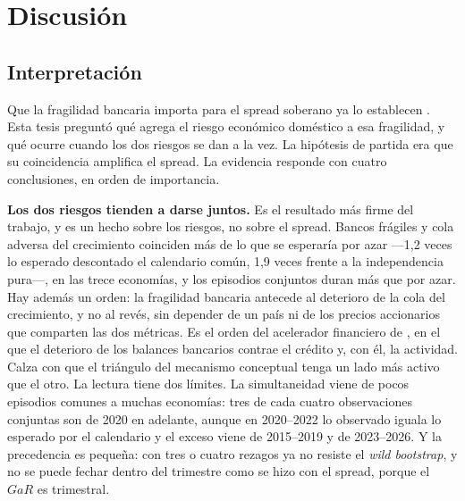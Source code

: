 \chapter{Discusión}
\label{sec:discusion}

\section{Interpretación}

Que la fragilidad bancaria importa para el spread soberano ya lo establecen \citet{Chari2024b}. Esta tesis preguntó qué agrega el riesgo económico doméstico a esa fragilidad, y qué ocurre cuando los dos riesgos se dan a la vez. La hipótesis de partida era que su coincidencia amplifica el spread. La evidencia responde con cuatro conclusiones, en orden de importancia.

\textbf{Los dos riesgos tienden a darse juntos.} Es el resultado más firme del trabajo, y es un hecho sobre los riesgos, no sobre el spread. Bancos frágiles y cola adversa del crecimiento coinciden más de lo que se esperaría por azar ---1,2 veces lo esperado descontado el calendario común, 1,9 veces frente a la independencia pura---, en las trece economías, y los episodios conjuntos duran más que por azar. Hay además un orden: la fragilidad bancaria antecede al deterioro de la cola del crecimiento, y no al revés, sin depender de un país ni de los precios accionarios que comparten las dos métricas. Es el orden del acelerador financiero de \citet{BernankeGertlerGilchrist1996}, en el que el deterioro de los balances bancarios contrae el crédito y, con él, la actividad. Calza con que el triángulo del mecanismo conceptual tenga un lado más activo que el otro. La lectura tiene dos límites. La simultaneidad viene de pocos episodios comunes a muchas economías: tres de cada cuatro observaciones conjuntas son de 2020 en adelante, aunque en 2020--2022 lo observado iguala lo esperado por el calendario y el exceso viene de 2015--2019 y de 2023--2026. Y la precedencia es pequeña: con tres o cuatro rezagos ya no resiste el \textit{wild bootstrap}, y no se puede fechar dentro del trimestre como se hizo con el spread, porque el $GaR$ es trimestral.

